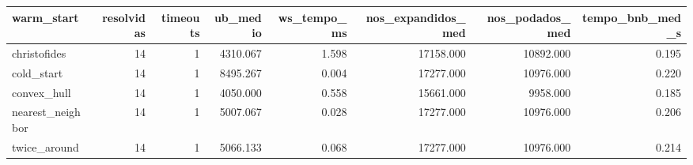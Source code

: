 \begin{tabular}{lrrrrrrr}
\toprule
warm\_start & resolvidas & timeouts & ub\_medio & ws\_tempo\_ms & nos\_expandidos\_med & nos\_podados\_med & tempo\_bnb\_med\_s \\
\midrule
christofides & 14 & 1 & 4310.067 & 1.598 & 17158.000 & 10892.000 & 0.195 \\
cold\_start & 14 & 1 & 8495.267 & 0.004 & 17277.000 & 10976.000 & 0.220 \\
convex\_hull & 14 & 1 & 4050.000 & 0.558 & 15661.000 & 9958.000 & 0.185 \\
nearest\_neighbor & 14 & 1 & 5007.067 & 0.028 & 17277.000 & 10976.000 & 0.206 \\
twice\_around & 14 & 1 & 5066.133 & 0.068 & 17277.000 & 10976.000 & 0.214 \\
\bottomrule
\end{tabular}
